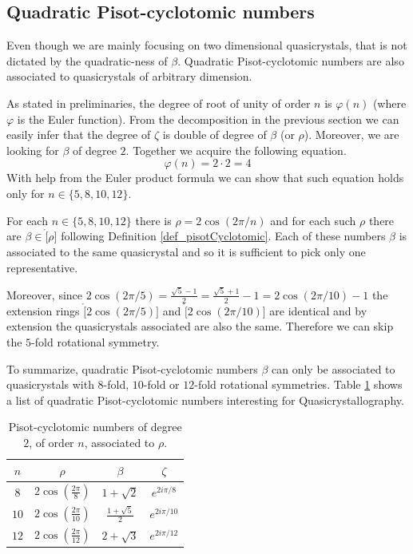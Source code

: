\documentclass[text.tex]{subfiles}
\begin{document}
\subsection{Quadratic Pisot-cyclotomic numbers}
\begin{remark}
Even though we are mainly focusing on two dimensional quasicrystals, that is not dictated by the quadratic-ness of $\beta$. Quadratic Pisot-cyclotomic numbers are also associated to quasicrystals of arbitrary dimension. 
\end{remark}

As stated in preliminaries, the degree of root of unity of order $n$ is $\varphi(n)$ (where $\varphi$ is the Euler function). From the decomposition in the previous section we can easily infer that the degree of $\zeta$ is double of degree of $\beta$ (or $\rho$). Moreover, we are looking for $\beta$ of degree $2$. Together we acquire the following equation. 
$$\varphi(n) = 2\cdot 2 = 4$$
With help from the Euler product formula we can show that such equation holds only for $n\in\{5,8,10,12\}$. 

For each $n\in\{5,8,10,12\}$ there is $\rho = 2\cos\left(2\pi/n\right)$ and for each such $\rho$ there are $\beta \in \ring[\rho]$ following Definition \ref{def_pisotCyclotomic}. Each of these numbers $\beta$ is associated to the same quasicrystal and so it is sufficient to pick only one representative. 

Moreover, since $2\cos\left(2\pi/5\right) = \frac{\sqrt{5}-1}{2} = \frac{\sqrt{5}+1}{2} -1 = 2\cos\left(2\pi/10\right) - 1$ the extension rings $\ring[2\cos\left(2\pi/5\right)]$ and $\ring[2\cos\left(2\pi/10\right)]$ are identical and by extension the quasicrystals associated are also the same. Therefore we can skip the $5$-fold rotational symmetry. 

To summarize, quadratic Pisot-cyclotomic numbers $\beta$ can only be associated to quasicrystals with $8$-fold, $10$-fold or $12$-fold rotational symmetries. Table \ref{tab_quadraticPisotCyclotomic} shows a list of quadratic Pisot-cyclotomic numbers interesting for Quasicrystallography. 

\begin{table}[h!]
\centering
\begin{tabular}{cccc}
$n$ & $\rho$ & $\beta$ & $\zeta$ \\
\hline
$8$  & $2 \cos\left(\frac{2\pi}{8}\right)$  & $ 1+\sqrt{2} $          & $e^{2i\pi/8}$  \\
$10$ & $2 \cos\left(\frac{2\pi}{10}\right)$ & $\frac{1+\sqrt{5}}{2} $ & $e^{2i\pi/10}$ \\
$12$ & $2 \cos\left(\frac{2\pi}{12}\right)$ & $ 2+\sqrt{3} $          & $e^{2i\pi/12}$ \\
\end{tabular}
\caption{Pisot-cyclotomic numbers of degree $2$, of order $n$, associated to $\rho$.}
\label{tab_quadraticPisotCyclotomic}
\end{table}
\end{document}
